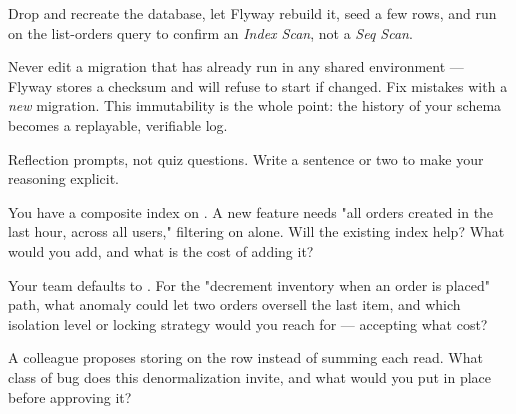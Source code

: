 Drop and recreate the database, let Flyway rebuild it, seed a few rows, and run  on the list-orders query to confirm an \emph{Index Scan}, not a \emph{Seq Scan}.

\begin{prodtip}
Never edit a migration that has already run in any shared environment --- Flyway stores a checksum and will refuse to start if  changed. Fix mistakes with a \emph{new}  migration. This immutability is the whole point: the history of your schema becomes a replayable, verifiable log.
\end{prodtip}


Reflection prompts, not quiz questions. Write a sentence or two to make your reasoning explicit.

\begin{thinkbox}
You have a composite index on . A new feature needs "all orders created in the last hour, across all users," filtering on  alone. Will the existing index help? What would you add, and what is the cost of adding it?
\end{thinkbox}

\begin{thinkbox}
Your team defaults to . For the "decrement inventory when an order is placed" path, what anomaly could let two orders oversell the last item, and which isolation level or locking strategy would you reach for --- accepting what cost?
\end{thinkbox}

\begin{thinkbox}
A colleague proposes storing  on the  row instead of summing  each read. What class of bug does this denormalization invite, and what would you put in place before approving it?
\end{thinkbox}


